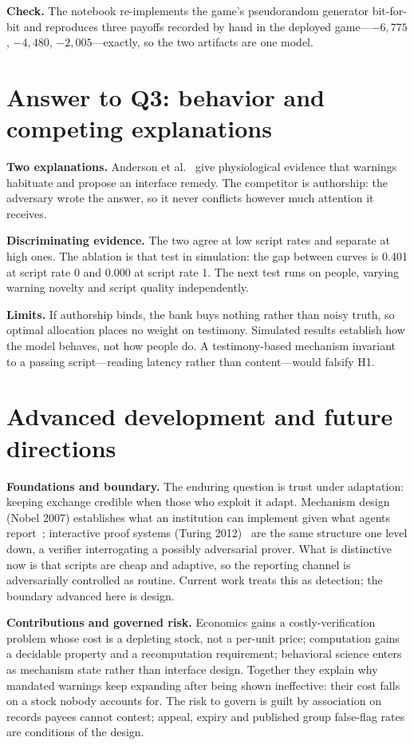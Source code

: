 \textbf{Check.} The notebook re-implements the game's pseudorandom
generator bit-for-bit and reproduces three payoffs recorded by hand in the
deployed game---$-6{,}775$, $-4{,}480$, $-2{,}005$---exactly, so the two
artifacts are one model.

\section{Answer to Q3: behavior and competing explanations}

\textbf{Two explanations.} Anderson et al.~\cite{anderson2016} give
physiological evidence that warnings habituate and propose an interface
remedy. The competitor is authorship: the adversary wrote the answer, so
it never conflicts however much attention it receives.

\textbf{Discriminating evidence.} The two agree at low script rates and
separate at high ones. The ablation is that test in simulation: the gap
between curves is 0.401 at script rate 0 and 0.000 at script rate 1. The
next test runs on people, varying warning novelty and script quality
independently.

\textbf{Limits.} If authorship binds, the bank buys nothing rather than
noisy truth, so optimal allocation places no weight on testimony.
Simulated results establish how the model behaves, not how people do. A
testimony-based mechanism invariant to a passing script---reading latency
rather than content---would falsify H1.

\section{Advanced development and future directions}

\textbf{Foundations and boundary.} The enduring question is trust under
adaptation: keeping exchange credible when those who exploit it adapt.
Mechanism design (Nobel 2007) establishes what an institution can
implement given what agents report~\cite{myerson1981}; interactive proof
systems (Turing 2012)~\cite{goldwasser1989} are the same structure one
level down, a verifier interrogating a possibly adversarial prover. What
is distinctive now is that scripts are cheap and adaptive, so the
reporting channel is adversarially controlled as routine. Current work
treats this as detection; the boundary advanced here is design.

\textbf{Contributions and governed risk.} Economics gains a
costly-verification problem whose cost is a depleting stock, not a
per-unit price; computation gains a decidable property and a recomputation
requirement; behavioral science enters as mechanism state rather than
interface design. Together they explain why mandated warnings keep
expanding after being shown ineffective: their cost falls on a stock
nobody accounts for. The risk to govern is guilt by association on records
payees cannot contest; appeal, expiry and published group false-flag rates
are conditions of the design.

